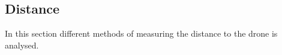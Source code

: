 \subsection{Distance}
In this section different methods of measuring the distance to the drone is analysed. 